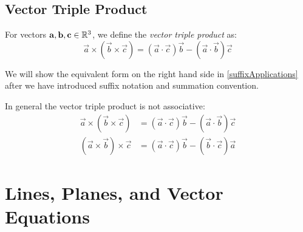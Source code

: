 \documentclass[../main.tex]{subfiles}
\begin{document}
\subsection{Vector Triple Product}
\begin{definition}
  For vectors $\mathbf{\bm{a}}, \mathbf{\bm{b}}, \mathbf{\bm{c}} \in \mathbb{R}^{3}$, we define the \textit{vector triple product} as:
  \begin{equation}
    \vec{a} \times (\vec{b} \times \vec{c}) = (\vec{a} \cdot \vec{c}) \vec{b} - (\vec{a} \cdot \vec{b}) \vec{c} \label{tripleProductExpansion}
  \end{equation}
\end{definition}
We will show the equivalent form on the right hand side in \cref{suffixApplications} after we have introduced suffix notation and summation convention.
\begin{remark}[Warning]
  In general the vector triple product is not associative:
  \begin{align*}
    \vec{a} \times (\vec{b} \times \vec{c}) &= (\vec{a} \cdot \vec{c}) \vec{b} - (\vec{a} \cdot \vec{b})\vec{c} \\
    (\vec{a} \times \vec{b}) \times \vec{c} &= (\vec{a} \cdot \vec{c}) \vec{b} - (\vec{b} \cdot \vec{c})\vec{a}
  \end{align*}
\end{remark}
\section{Lines, Planes, and Vector Equations}
\end{document}
